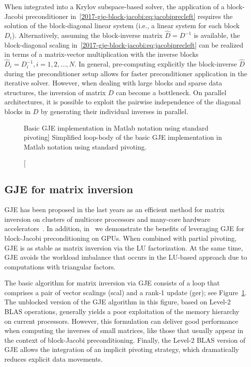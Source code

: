 When integrated into a Krylov subspace-based solver, 
the application of a block-Jacobi preconditioner in~\eqref{2017-gje-block-jacobi:eq:jacobiprecleft}
requires the solution of the block-diagonal linear system (i.e., a linear system
for each block $D_i$).
Alternatively, 
assuming the block-inverse matrix $\hat{D}=D^{-1}$
is available, the block-diagonal scaling in~\eqref{2017-gje-block-jacobi:eq:jacobiprecleft}
can be realized in terms of a matrix-vector multiplication with the inverse blocks
$\hat{D}_i=D_i^{-1}, i=1,2,\dots,N$.
In general, pre-computing explicitly the block-inverse $\hat{D}$ during the preconditioner setup 
allows for faster preconditioner application in the iterative solver.
However, when dealing with large blocks and 
sparse data structures, 
the inversion of matrix $D$ can become a bottleneck. 
On parallel architectures, it is possible to exploit the pairwise independence of the diagonal blocks in $D$
by generating their individual inverses in parallel.

\begin{figure}[t]

\caption
[Basic GJE implementation in Matlab notation using standard pivoting]
{Simplified loop-body of the basic GJE implementation in Matlab
    notation using standard pivoting.}
\label{2017-gje-block-jacobi:fig:gje}
\end{figure}
\subsection{GJE for matrix inversion}\label{2017-gje-block-jacobi:sec:gauss-jordan}

GJE has been proposed in the last years
as an efficient method for matrix inversion on 
clusters of multicore processors and many-core hardware accelerators~\cite{doi:10.1137/S1064827598345679,CPE:CPE2933}.
In addition, in~\cite{Anzt:2017:BGE:3026937.3026940} we demonstrate the benefits of {leveraging} GJE 
for block-Jacobi preconditioning on GPUs.
When combined with partial pivoting, GJE is as stable as matrix inversion via the LU factorization. 
At the same time, GJE avoids the workload imbalance that occurs in the LU-based approach 
{due to computations with}
triangular factors.

The basic algorithm for matrix inversion via GJE consists of
a loop that comprises a pair of vector scalings ({\sc scal}) and a rank-1
update ({\sc ger}); see Figure~\ref{2017-gje-block-jacobi:fig:gje}.
The unblocked version of the GJE algorithm in this figure, based
on Level-2 BLAS operations,
generally yields a poor exploitation of the memory hierarchy on current processors.
However, this formulation can
deliver good performance when computing the inverses of small matrices,
like {those that usually appear}
in the context of block-Jacobi preconditioning. 
Finally, the Level-2 BLAS version of GJE allows {the integration of} an implicit pivoting strategy,
which dramatically reduces explicit data movements.


